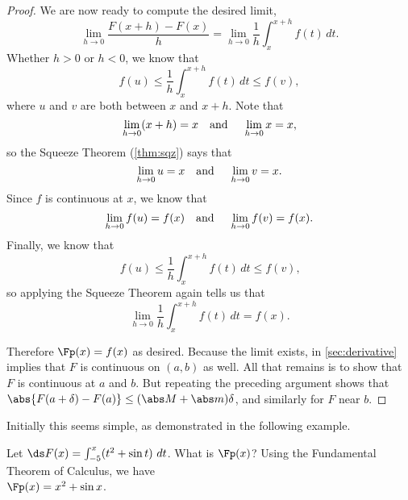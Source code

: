 \begin{proof}
We are now ready to compute the desired limit,
\[\lim_{h\to 0}\frac{F(x+h)-F(x)}{h}=\lim_{h\to 0}\frac1h\int_x^{x+h} f(t)\,dt.\]
Whether $h>0$ or $h<0$, we know that
\[f(u)\leq \frac1h\int_x^{x+h} f(t)\,dt\leq f(v),\]
where $u$ and $v$ are both between $x$ and $x+h$. Note that 
\[\lim_{h\to 0} (x+h)=x \text{\quad and \quad} \lim_{h\to 0} x=x,\]
so the Squeeze Theorem (\autoref{thm:sqz}) says that
\[\lim_{h\to 0}u=x \text{\quad and \quad} \lim_{h\to 0} v=x.\]
Since $f$ is continuous at $x$, we know that
\[\lim_{h\to 0} f(u)=f(x)\text{\quad and \quad} \lim_{h\to 0}f(v)=f(x).\]
Finally, we know that
\[f(u)\leq \frac1h \int_x^{x+h} f(t)\,dt\leq f(v)\text{,}\]
so applying the Squeeze Theorem again tells us that
\[\lim_{h\to 0}\frac1h\int_x^{x+h} f(t)\,dt=f(x).\] 

Therefore $\Fp(x)=f(x)$ as desired.  Because the limit exists,  in \autoref{sec:derivative} implies that $F$ is continuous on $(a,b)$ as well. All that remains is to show that $F$ is continuous at $a$ and $b$.  But repeating the preceding argument shows that $\abs{F(a+\delta)-F(a)}\le(\abs M+\abs m)\delta$, and similarly for $F$ near $b$.%
\end{proof}


Initially this seems simple, as demonstrated in the following example.

\begin{example}\label{ex_ftc2}
Let $\ds F(x) = \int_{-5}^x (t^2+\sin t)\ dt$. What is $\Fp(x)$?
\solution
Using the Fundamental Theorem of Calculus, we have\\
$\Fp(x) = x^2+\sin x$.
\end{example}

